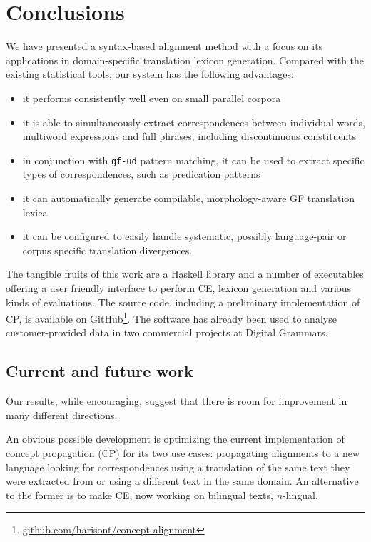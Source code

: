 \documentclass[11pt]{article}
\begin{document}
\section{Conclusions} \label{conclusions}
We have presented a syntax-based alignment method with a focus on its applications in domain-specific translation lexicon generation. Compared with the existing statistical tools, our system has the following advantages:
\begin{itemize} \setlength\itemsep{0.1em}
  \item it performs consistently well even on small parallel corpora
  \item it is able to simultaneously extract correspondences between individual words, multiword expressions and full phrases, including discontinuous constituents
  \item in conjunction with \texttt{gf-ud} pattern matching, it can be used to extract specific types of correspondences, such as predication patterns  
  \item it can automatically generate compilable, morphology-aware GF translation lexica
  \item it can be configured to easily handle systematic, possibly language-pair or corpus specific translation divergences.
\end{itemize}

The tangible fruits of this work are a Haskell library and a number of executables offering a user friendly interface to perform CE, lexicon generation and various kinds of evaluations. 
The source code, including a preliminary implementation of CP, is available on GitHub\footnote{\url{github.com/harisont/concept-alignment}}. 
The software has already been used to analyse customer-provided data in two commercial projects at Digital Grammars. 

\subsection{Current and future work}
Our results, while encouraging, suggest that there is room for improvement in many different directions.

An obvious possible development is optimizing the current implementation of concept propagation (CP) for its two use cases: propagating alignments to a new language looking for correspondences using a translation of the same text they were extracted from or using a different text in the same domain.
An alternative to the former is to make CE, now working on bilingual texts, $n$-lingual.
\end{document}
